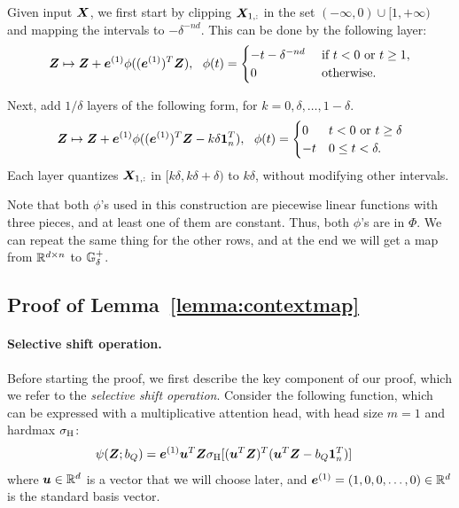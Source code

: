 Given input ${\bm{X}}$, we first start by clipping ${\bm{X}}_{1,:}$ in the set $(-\infty, 0) \cup [1, +\infty)$ and mapping the intervals to $-\delta^{-nd}$. This can be done by the following layer:
\begin{equation*}
    {\bm{Z}} \mapsto {\bm{Z}} + {\bm{e}}^{(1)} \phi( ({\bm{e}}^{(1)})^T {\bm{Z}} ),
    ~~
    \phi(t) = 
    \begin{cases}
        -t - \delta^{-nd} & \text{ if } t < 0 \text{ or } t \geq 1,\\
        0 & \text{ otherwise.}
    \end{cases}
\end{equation*}

Next, add $1/\delta$ layers of the following form, for $k = 0, \delta, \dots, 1-\delta$.
\begin{equation*}
    {\bm{Z}} \mapsto {\bm{Z}} + {\bm{e}}^{(1)} \phi( ({\bm{e}}^{(1)})^T {\bm{Z}} - k\delta {\bm{1}}_n^T),
    ~~
    \phi(t) = 
    \begin{cases}
    0 & t < 0 \text{ or } t \geq \delta\\
    -t & 0 \leq t < \delta.
    \end{cases}
\end{equation*}
Each layer quantizes ${\bm{X}}_{1,:}$ in $[k\delta, k\delta+\delta)$ to $k\delta$, without modifying other intervals.

Note that both $\phi$'s used in this construction are piecewise linear functions with three pieces, and at least one of them are constant. Thus, both $\phi$'s are in $\Phi$. We can repeat the same thing for the other rows, and at the end we will get a map from $\mathbb{R}^{d \times n}$ to ${\mathbb{G}}^+_{\delta}$.


\subsection{Proof of Lemma~\ref{lemma:contextmap}}
\label{sec:proof-contextmap}

\paragraph{Selective shift operation.}
Before starting the proof, we first describe the key component of our proof, which we refer to the \emph{selective shift operation}.
Consider the following function, which can be expressed with a multiplicative attention head, with head size $m = 1$ and hardmax $\sigma_{\rm H}$:
\begin{align*}
    \psi({\bm{Z}}; b_Q) &= {\bm{e}}^{(1)} {\bm{u}}^T {\bm{Z}} \sigma_{\rm H} [ ({\bm{u}}^T {\bm{Z}})^T ({\bm{u}}^T {\bm{Z}} - b_Q {\bm{1}}_n^T) ]
\end{align*}
where ${\bm{u}} \in \mathbb{R}^d$ is a vector that we will choose later, and ${\bm{e}}^{(1)} = (1, 0, 0, \dots, 0) \in \mathbb{R}^d$ is the standard basis vector.

